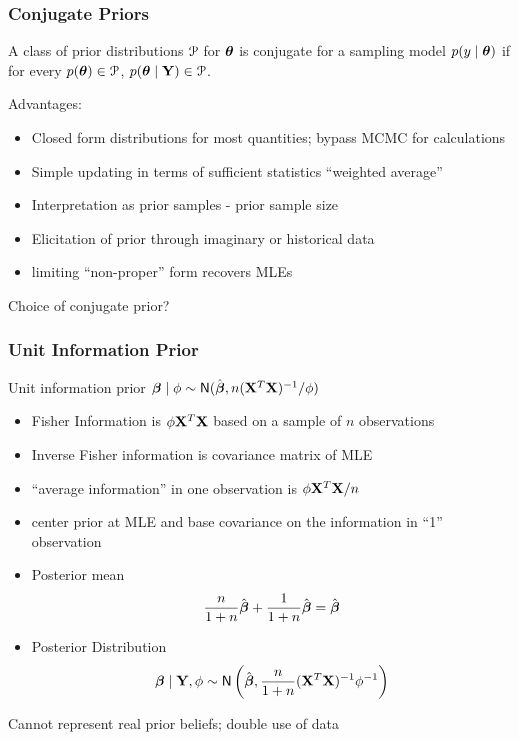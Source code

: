 \documentclass[]{beamer}
\begin{document}
\begin{frame}
  \frametitle{Conjugate Priors}
  \begin{definition}
    A class of prior distributions ${\cal{P}}$ for $\boldsymbol{\theta}$ is conjugate for a
    sampling model $p(y \mid \boldsymbol{\theta})$ if for every $p(\boldsymbol{\theta}) \in {\cal{P}}$, $p(\boldsymbol{\theta}
    \mid \mathbf{Y}) \in {\cal{P}}$.
  \end{definition}
\pause  
  Advantages: \pause
  \begin{itemize}
  \item Closed form distributions for most quantities; bypass MCMC for
    calculations \pause
  \item Simple updating in terms of sufficient statistics ``weighted
    average'' \pause
  \item Interpretation as prior samples - prior sample size \pause
  \item Elicitation of prior through imaginary or historical data \pause
  \item limiting ``non-proper'' form recovers MLEs \pause
  \end{itemize}
Choice of conjugate prior?
\end{frame}

\begin{frame}
  \frametitle{Unit Information Prior}

Unit information prior $\boldsymbol{\beta} \mid \phi \sim \textsf{N}(\hat{\boldsymbol{\beta}}, n
   (\mathbf{X}^T\mathbf{X})^{-1}/\phi)$ \pause
  \begin{itemize}
\item Fisher Information is $\phi \mathbf{X}^T\mathbf{X}$ based on a sample of $n$
  observations \pause
\item Inverse Fisher information is covariance matrix of MLE \pause
\item ``average information'' in one observation is  $\phi \mathbf{X}^T\mathbf{X} /n$ \pause
\item center prior at MLE and base covariance on the information in
  ``1'' observation \pause
\item  Posterior mean 
$$\frac{n}{1 + n} \hat{\boldsymbol{\beta}} +  \frac{1}{1 + n}\hat{\boldsymbol{\beta}} = \hat{\boldsymbol{\beta}}$$ \pause
\item Posterior Distribution 
$$\boldsymbol{\beta} \mid \mathbf{Y}, \phi \sim \textsf{N}\left( \hat{\boldsymbol{\beta}}, \frac{n}{1 + n} (\mathbf{X}^T\mathbf{X})^{-1}
  \phi^{-1} \right)$$ \pause
    \end{itemize}
Cannot represent real prior beliefs; double use of data
\end{frame}
\end{document}
